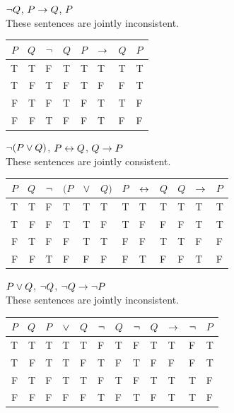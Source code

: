 \begin{small}
\begin{earg}
\item ${\neg} Q$, $P \rightarrow Q$, $P$\\
These sentences are jointly inconsistent.
\begin{flushleft}
\begin{tabular}{d d | f h | f e h | f}
$P$ & $Q$ & ${\neg}$ & $Q$ & $P$ & $\rightarrow$ & $Q$ & $P$\\
\hline
T & T &  F & T &    T & T & T &   T\Tstrut\\ 
T & F &  T & F &    T & F & F &   T\\ 
F & T &  F & T &    F & T & T &   F\\ 
F & F &  T & F &    F & T & F &   F
\end{tabular}
\end{flushleft}\medskip

\item ${\neg}(P \vee Q)$, $P \leftrightarrow Q$, $Q \rightarrow P$\\
These sentences are jointly consistent.
\begin{flushleft}
\begin{tabular}{d d | f e e h | f  e  h | f  e  e }
$P$ & $Q$ & ${\neg}$ & $(P$ & $\vee$ & $Q)$ & $P$ & $\leftrightarrow$ & $Q$ & $Q$ & $\rightarrow$ & $P$\\
\hline
T & T &  F &   T & T & T &     T & T &  T &     T & T & T\Tstrut\\
T & F &  F &   T & T & F &     T & F &  F &      F & T & T\\   
F & T &  F &   F & T & T &     F & F &  T &      T & F & F\\
F & F &  T &   F & F & F &     F & T &  F &      F & T & F 
\end{tabular}
\end{flushleft}\medskip

\item $P \vee Q$, ${\neg} Q$, ${\neg} Q \rightarrow {\neg} P$\\
These sentences are jointly inconsistent.
\begin{flushleft}
\begin{tabular}{d d |  f  e  h  | f  h | f  e  e  e  e}
$P$ & $Q$ & $P$ & $\vee$ & $Q$ & ${\neg}$ & $Q$ & ${\neg}$ & $Q$ & $\rightarrow$ & ${\neg}$ & $P$\\
\hline
T & T &    T & T & T &   F & T &    F & T & T & F & T\Tstrut\\
T & F &    T & T & F &   T & F &    T & F & F & F & T\\   
F & T &    F & T & T &   F & T &    F & T & T & T & F\\
F & F &    F & F & F &   T & F &    T & F & T & T & F
\end{tabular}
\end{flushleft}\medskip


\end{earg}
\end{small}
